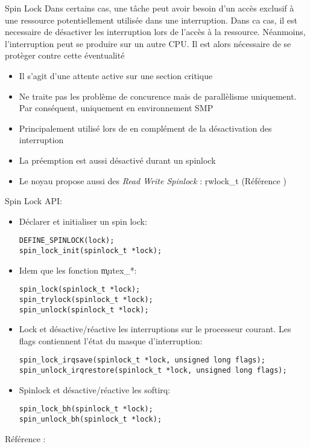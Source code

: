 \begin{frame}[fragile=singleslide]{Spin Lock}
  Dans certains cas, une tâche peut avoir besoin d'un accès exclusif à
  une ressource  potentiellement utilisée dans  une interruption. Dans
  ca cas,  il est  necessaire de désactiver  les interruption  lors de
  l'accès à la ressource.   Néanmoins, l'interruption peut se produire
  sur un  autre CPU.   Il est alors  nécessaire de se  protèger contre
  cette éventualité
  \begin{itemize} 
  \item Il s'agit d'une attente active sur une section critique
  \item Ne traite pas les  problème de concurence mais de parallèlisme
    uniquement. Par conséquent, uniquement en environnement SMP
  \item   Principalement  utilisé   lors  de   en  complément   de  la
    désactivation des interruption
  \item La préemption est aussi désactivé durant un spinlock
  \item  Le  noyau propose  aussi  des  \emph{Read  Write Spinlock}  :
    \c{rwlock_t} (Référence )
  \end{itemize}  
\end{frame}

\begin{frame}[fragile=singleslide]{Spin Lock}
  API:
  \begin{itemize}
  \item Déclarer et initialiser un spin lock:
    \begin{lstlisting} 
DEFINE_SPINLOCK(lock);
spin_lock_init(spinlock_t *lock);
    \end{lstlisting} 
  \item Idem que les fonction \c{mutex_*}:
    \begin{lstlisting} 
spin_lock(spinlock_t *lock);
spin_trylock(spinlock_t *lock);
spin_unlock(spinlock_t *lock);
    \end{lstlisting} 
  \item Lock et désactive/réactive les interruptions sur le processeur
    courant.  Les flags contiennent l'état du masque d'interruption:
    \begin{lstlisting} 
spin_lock_irqsave(spinlock_t *lock, unsigned long flags);
spin_unlock_irqrestore(spinlock_t *lock, unsigned long flags);
    \end{lstlisting} 
  \item Spinlock et désactive/réactive les softirq:
    \begin{lstlisting} 
spin_lock_bh(spinlock_t *lock);
spin_unlock_bh(spinlock_t *lock);
    \end{lstlisting} 
  \end{itemize}
  Référence :  
\end{frame}


